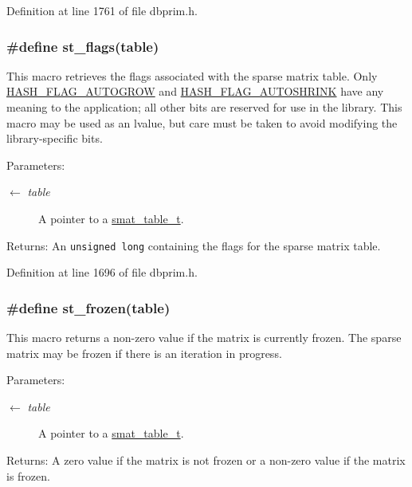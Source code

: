 Definition at line 1761 of file dbprim.h.\hypertarget{group__dbprim__smat_ga35}{
\subsubsection[st\_\-flags]{\setlength{\rightskip}{0pt plus 5cm}\#define st\_\-flags(table)}}
\label{group__dbprim__smat_ga35}


This macro retrieves the flags associated with the sparse matrix table. Only \hyperlink{group__dbprim__hash_ga22}{HASH\_\-FLAG\_\-AUTOGROW} and \hyperlink{group__dbprim__hash_ga23}{HASH\_\-FLAG\_\-AUTOSHRINK} have any meaning to the application; all other bits are reserved for use in the library. This macro may be used as an lvalue, but care must be taken to avoid modifying the library-specific bits.

\begin{Desc}
\item[Parameters:]
\begin{description}
\item[\mbox{$\leftarrow$} {\em table}]A pointer to a \hyperlink{group__dbprim__smat_ga0}{smat\_\-table\_\-t}.\end{description}
\end{Desc}
\begin{Desc}
\item[Returns:]An {\tt unsigned long} containing the flags for the sparse matrix table.\end{Desc}


Definition at line 1696 of file dbprim.h.\hypertarget{group__dbprim__smat_ga36}{
\subsubsection[st\_\-frozen]{\setlength{\rightskip}{0pt plus 5cm}\#define st\_\-frozen(table)}}
\label{group__dbprim__smat_ga36}


This macro returns a non-zero value if the matrix is currently frozen. The sparse matrix may be frozen if there is an iteration in progress.

\begin{Desc}
\item[Parameters:]
\begin{description}
\item[\mbox{$\leftarrow$} {\em table}]A pointer to a \hyperlink{group__dbprim__smat_ga0}{smat\_\-table\_\-t}.\end{description}
\end{Desc}
\begin{Desc}
\item[Returns:]A zero value if the matrix is not frozen or a non-zero value if the matrix is frozen.\end{Desc}


